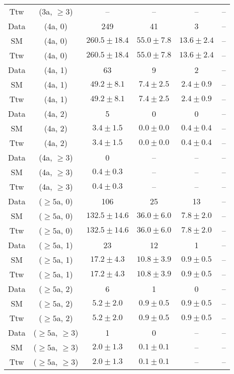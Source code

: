 \begin{table}[h!]
{\begin{tabular}{cccccc}
	Ttw & (3a, $\ge3$) & -- & -- & -- & -- \\[0.5ex] 
	Data & (4a, 0) & 249 & 41 & 3 & -- \\[0.5ex] 
	SM & (4a, 0) & $260.5\pm 18.4$ & $55.0\pm 7.8$ & $13.6\pm 2.4$ & -- \\[0.5ex] 
	Ttw & (4a, 0) & $260.5\pm 18.4$ & $55.0\pm 7.8$ & $13.6\pm 2.4$ & -- \\[0.5ex] 
	Data & (4a, 1) & 63 & 9 & 2 & -- \\[0.5ex] 
	SM & (4a, 1) & $49.2\pm 8.1$ & $7.4\pm 2.5$ & $2.4\pm 0.9$ & -- \\[0.5ex] 
	Ttw & (4a, 1) & $49.2\pm 8.1$ & $7.4\pm 2.5$ & $2.4\pm 0.9$ & -- \\[0.5ex] 
	Data & (4a, 2) & 5 & 0 & 0 & -- \\[0.5ex] 
	SM & (4a, 2) & $3.4\pm 1.5$ & $0.0\pm 0.0$ & $0.4\pm 0.4$ & -- \\[0.5ex] 
	Ttw & (4a, 2) & $3.4\pm 1.5$ & $0.0\pm 0.0$ & $0.4\pm 0.4$ & -- \\[0.5ex] 
	Data & (4a, $\ge3$) & 0 & -- & -- & -- \\[0.5ex] 
	SM & (4a, $\ge3$) & $0.4\pm 0.3$ & -- & -- & -- \\[0.5ex] 
	Ttw & (4a, $\ge3$) & $0.4\pm 0.3$ & -- & -- & -- \\[0.5ex] 
	Data & ($\ge5$a, 0) & 106 & 25 & 13 & -- \\[0.5ex] 
	SM & ($\ge5$a, 0) & $132.5\pm 14.6$ & $36.0\pm 6.0$ & $7.8\pm 2.0$ & -- \\[0.5ex] 
	Ttw & ($\ge5$a, 0) & $132.5\pm 14.6$ & $36.0\pm 6.0$ & $7.8\pm 2.0$ & -- \\[0.5ex] 
	Data & ($\ge5$a, 1) & 23 & 12 & 1 & -- \\[0.5ex] 
	SM & ($\ge5$a, 1) & $17.2\pm 4.3$ & $10.8\pm 3.9$ & $0.9\pm 0.5$ & -- \\[0.5ex] 
	Ttw & ($\ge5$a, 1) & $17.2\pm 4.3$ & $10.8\pm 3.9$ & $0.9\pm 0.5$ & -- \\[0.5ex] 
	Data & ($\ge5$a, 2) & 6 & 1 & 0 & -- \\[0.5ex] 
	SM & ($\ge5$a, 2) & $5.2\pm 2.0$ & $0.9\pm 0.5$ & $0.9\pm 0.5$ & -- \\[0.5ex] 
	Ttw & ($\ge5$a, 2) & $5.2\pm 2.0$ & $0.9\pm 0.5$ & $0.9\pm 0.5$ & -- \\[0.5ex] 
	Data & ($\ge5$a, $\ge3$) & 1 & 0 & -- & -- \\[0.5ex] 
	SM & ($\ge5$a, $\ge3$) & $2.0\pm 1.3$ & $0.1\pm 0.1$ & -- & -- \\[0.5ex] 
	Ttw & ($\ge5$a, $\ge3$) & $2.0\pm 1.3$ & $0.1\pm 0.1$ & -- & -- \\[0.5ex] 
	\hline
	\hline
\end{tabular}}
\end{table}
